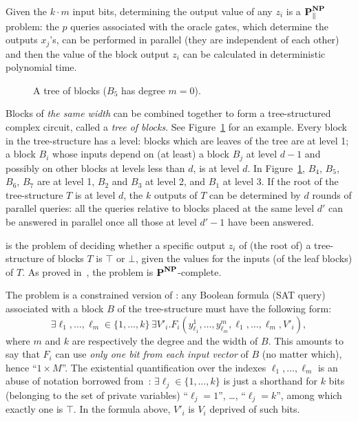 Given the $k\cdot m$ input bits, determining the output value of any $z_i$ is a $\textbf{P}^{\textbf{NP}}_{\parallel}$ problem: the $p$ queries associated with the oracle gates, which determine the outputs $x_j$'s, can be performed in parallel (they are independent of each other) and then the value of the block output $z_i$ can be calculated in deterministic polynomial time.

\begin{figure}[tp]
    \centering
    \resizebox{0.8\linewidth}{!}{}
        
    \caption{A tree of blocks ($B_5$ has degree $m=0$).}\label{tob}
\end{figure}%

Blocks of \emph{the same width} can be combined together to form a tree-structured complex circuit, called a \emph{tree of blocks}. See Figure~\ref{tob} for an example.
%
Every block in the tree-structure has a level: blocks which are leaves of the tree are at level 1;
a block $B_i$ whose inputs depend on (at least) a block $B_j$ at level $d-1$ and possibly on other blocks at levels less than $d$, is at level $d$. In Figure~\ref{tob}, 
$B_4$, $B_5$, $B_6$, $B_7$ are at level 1,
$B_2$ and $B_3$ at level 2, 
and $B_1$ at level 3. 
If the root of the tree-structure $T$ is at level $d$, the $k$ outputs of $T$ can be determined by $d$ rounds of parallel queries: all the queries relative to blocks placed at the same level $d'$ can be answered in parallel once all those at level $d'-1$ have been answered. 

\TBSAT{} is the problem of deciding whether a specific output $z_i$ of (the root of) a tree-structure of blocks $T$ is $\top$ or $\bot$, given the values for the inputs (of the leaf blocks) of $T$. As proved in~\cite{schnoebelen2003}, the problem \TBSAT{} is $\textbf{P}^{\textbf{NP}}$-complete.

The problem \TBSATM{} is a constrained version of \TBSAT{}: any Boolean formula (SAT query) associated with a block $B$ of the tree-structure must have the following form: \[\exists\ell_1,\ldots ,\ell_m\in\{1,\ldots ,k\}\,\exists V'_i.F_i(y^1_{\ell_1},\ldots ,y^m_{\ell_m},\ell_1,\ldots ,\ell_m,V'_i),\] where $m$ and $k$ are respectively the degree and the width of $B$. This amounts to say that $F_i$ can use \emph{only one bit from each input vector} of $B$ (no matter which), hence ``$1\times M$''. 
The existential quantification over the indexes $\ell_1,\ldots ,\ell_m$ is an abuse of notation borrowed from~\cite{schnoebelen2003}: %
$\exists\ell_j\in\{1,\ldots ,k\}$ is just a shorthand for $k$ bits (belonging to the set of private variables) ``$\ell_j=1$'', \dots , ``$\ell_j=k$'', among which exactly one is $\top$. In the  formula above, $V'_i$ is $V_i$ deprived of such bits.%

